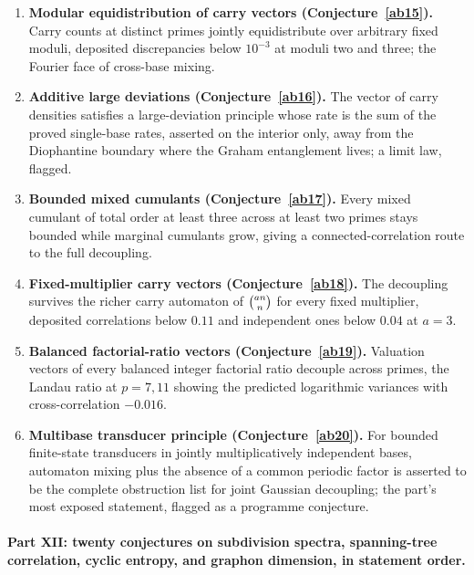 \documentclass[11pt]{article}
\theoremstyle{definition}
\begin{document}
\begin{enumerate}
\item \textbf{Modular equidistribution of carry vectors (Conjecture~\ref{ab15}).}  Carry counts at distinct primes jointly equidistribute over arbitrary fixed moduli, deposited discrepancies below $10^{-3}$ at moduli two and three; the Fourier face of cross-base mixing.
\item \textbf{Additive large deviations (Conjecture~\ref{ab16}).}  The vector of carry densities satisfies a large-deviation principle whose rate is the sum of the proved single-base rates, asserted on the interior only, away from the Diophantine boundary where the Graham entanglement lives; a limit law, flagged.
\item \textbf{Bounded mixed cumulants (Conjecture~\ref{ab17}).}  Every mixed cumulant of total order at least three across at least two primes stays bounded while marginal cumulants grow, giving a connected-correlation route to the full decoupling.
\item \textbf{Fixed-multiplier carry vectors (Conjecture~\ref{ab18}).}  The decoupling survives the richer carry automaton of $\tbinom{an}{n}$ for every fixed multiplier, deposited correlations below $0.11$ and independent ones below $0.04$ at $a=3$.
\item \textbf{Balanced factorial-ratio vectors (Conjecture~\ref{ab19}).}  Valuation vectors of every balanced integer factorial ratio decouple across primes, the Landau ratio at $p=7,11$ showing the predicted logarithmic variances with cross-correlation $-0.016$.
\item \textbf{Multibase transducer principle (Conjecture~\ref{ab20}).}  For bounded finite-state transducers in jointly multiplicatively independent bases, automaton mixing plus the absence of a common periodic factor is asserted to be the complete obstruction list for joint Gaussian decoupling; the part's most exposed statement, flagged as a programme conjecture.
\end{enumerate}

\paragraph{Part XII: twenty conjectures on subdivision spectra, spanning-tree correlation, cyclic entropy, and graphon dimension, in statement order.}
\end{document}
